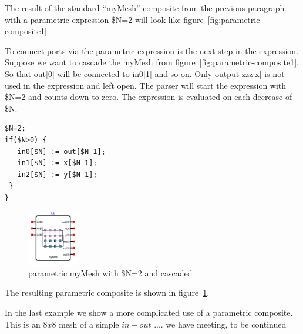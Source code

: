 The result of the standard ``myMesh'' composite from the previous paragraph with
a parametric expression \$N=2 will look like
figure~\ref{fig:parametric-composite1}

To connect ports via the parametric expression is the next step in the
expression. Suppose we want to cascade the myMesh from
figure~\ref{fig:parametric-composite1}. So that out[0] will be connected to
in0[1] and so on. Only output zzz[x] is not used in the expression and left
open.
The parser will start the expression with \$N=2 and counts down to zero. The
expression is evaluated on each decrease of \$N.

\begin{lstlisting}
$N=2;
if($N>0) {
   in0[$N] := out[$N-1];
   in1[$N] := x[$N-1];
   in2[$N] := y[$N-1];
 }
}
\end{lstlisting}

\begin{figure}
  \vspace{-20pt}
  \begin{center}
    \includegraphics[width=0.20\textwidth]{pictures/parametric-composite2}
  \caption{parametric myMesh with \$N=2 and cascaded}
  \label{fig:parametric-composite2}
  \end{center}
  \vspace{-20pt}
\end{figure}

The resulting parametric composite is shown in figure~\ref{fig:parametric-composite2}.

In the last example we show a more complicated use of a parametric composite.
This is an $8x8$ mesh of a simple $in-out$ .... we have meeting, to be continued 






\newpage